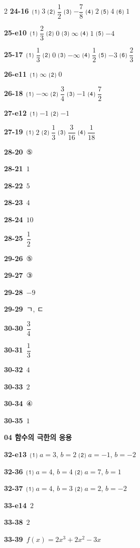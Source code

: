 \documentclass[10pt,a4paper]{article}
\begin{document}
\begin{multicols}{2}
\noindent\textbf{24-16}\ ⑴ $3$ ⑵ $\dfrac{1}{2}$ ⑶ $-\dfrac{7}{8}$ ⑷ $2$ ⑸ $4$ ⑹ $1$\par
\noindent\textbf{25-e10}\ ⑴ $\dfrac{2}{3}$ ⑵ $0$ ⑶ $\infty$ ⑷ $1$ ⑸ $-4$\par
\noindent\textbf{25-17}\ ⑴ $\dfrac{1}{3}$ ⑵ $0$ ⑶ $-\infty$ ⑷ $\dfrac{1}{2}$ ⑸ $-3$ ⑹ $\dfrac{2}{3}$\par
\noindent\textbf{26-e11}\ ⑴ $\infty$ ⑵ $0$\par
\noindent\textbf{26-18}\ ⑴ $-\infty$ ⑵ $\dfrac{3}{4}$ ⑶ $-1$ ⑷ $\dfrac{7}{2}$\par
\noindent\textbf{27-e12}\ ⑴ $-1$ ⑵ $-1$\par
\noindent\textbf{27-19}\ ⑴ $2$ ⑵ $\dfrac{1}{3}$ ⑶ $\dfrac{3}{16}$ ⑷ $\dfrac{1}{18}$\par
\noindent\textbf{28-20}\ ⑤\par
\noindent\textbf{28-21}\ $1$\par
\noindent\textbf{28-22}\ $5$\par
\noindent\textbf{28-23}\ $4$\par
\noindent\textbf{28-24}\ $10$\par
\noindent\textbf{28-25}\ $\dfrac{1}{2}$\par
\noindent\textbf{29-26}\ ⑤\par
\noindent\textbf{29-27}\ ③\par
\noindent\textbf{29-28}\ $-9$\par
\noindent\textbf{29-29}\ ㄱ, ㄷ\par
\noindent\textbf{30-30}\ $\dfrac{3}{4}$\par
\noindent\textbf{30-31}\ $\dfrac{1}{3}$\par
\noindent\textbf{30-32}\ $4$\par
\noindent\textbf{30-33}\ $2$\par
\noindent\textbf{30-34}\ ④\par
\noindent\textbf{30-35}\ $1$\par
\noindent\textbf{04 함수의 극한의 응용}\par\smallskip
\noindent\textbf{32-e13}\ ⑴ $a=3$, $b=2$ ⑵ $a=-1$, $b=-2$\par
\noindent\textbf{32-36}\ ⑴ $a=4$, $b=4$ ⑵ $a=7$, $b=1$\par
\noindent\textbf{32-37}\ ⑴ $a=4$, $b=3$ ⑵ $a=2$, $b=-2$\par
\noindent\textbf{33-e14}\ $2$\par
\noindent\textbf{33-38}\ $2$\par
\noindent\textbf{33-39}\ $f(x)=2x^3+2x^2-3x$\par

\end{multicols}
\end{document}
